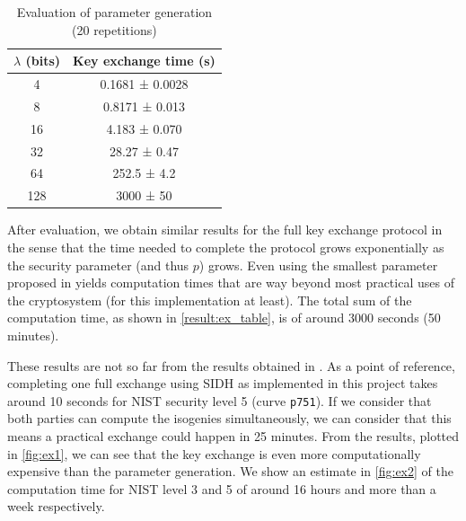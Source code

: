 \documentclass[a4paper,11pt,oneside]{report}
\begin{document}
    \begin{table}[!h]
        \label{result:ex_table}
        \begin{center}
        \begin{tabular}{| c | c |}
        \hline
        \textbf{$\lambda$ (bits)} & \textbf{Key exchange time (s)}  \\ 
        \hline

        4 & 0.1681 ± 0.0028\\ \hline
        8 & 0.8171 ± 0.013\\ \hline
        16 & 4.183 ± 0.070\\ \hline
        32 & 28.27 ± 0.47\\ \hline
        64 & 252.5 ± 4.2\\ \hline
        128 & 3000 ± 50\\ \hline
        \hline
        \end{tabular}
        \end{center}
        \caption{Evaluation of parameter generation (20 repetitions)}
    \end{table}

    After evaluation, we obtain similar results for the full key exchange protocol in the sense that the time needed to complete the protocol grows exponentially as the security parameter (and thus $p$) grows. Even using the smallest parameter proposed in \cite{msidh} yields computation times that are way beyond most practical uses of the cryptosystem (for this implementation at least). The total sum of the computation time, as shown in \autoref{result:ex_table}, is of around 3000 seconds (50 minutes). 
    
    
    
    These results are not so far from the results obtained in \cite{compression}. As a point of reference, completing one full exchange using SIDH as implemented in this project takes around 10 seconds for NIST security level 5 (curve \texttt{p751}). If we consider that both parties can compute the isogenies simultaneously, we can consider that this means a practical exchange could happen in 25 minutes. From the results, plotted in \autoref{fig:ex1}, we can see that the key exchange is even more computationally expensive than the parameter generation. We show an estimate in \autoref{fig:ex2} of the computation time for NIST level 3 and 5 of around 16 hours and more than a week respectively. 
    
\end{document}
